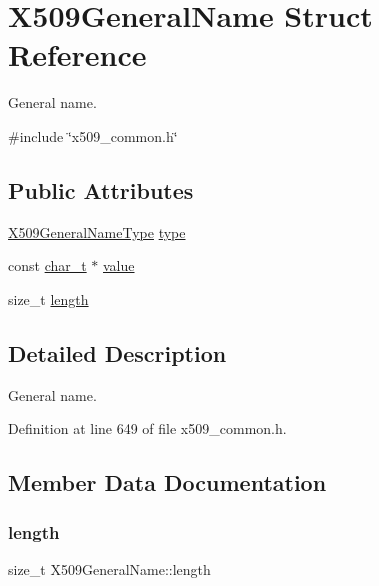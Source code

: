 \hypertarget{structX509GeneralName}{}\section{X509\+General\+Name Struct Reference}
\label{structX509GeneralName}


General name.  




{\ttfamily \#include \char`\"{}x509\+\_\+common.\+h\char`\"{}}

\subsection*{Public Attributes}
\begin{DoxyCompactItemize}
\item 
\hyperlink{certificate_2x509__common_8h_a6a82f43a61ee7a3e18d71f986d7f9a59}{X509\+General\+Name\+Type} \hyperlink{structX509GeneralName_a014e3358c1ab42d4da4cd2535d59f05f}{type}
\item 
const \hyperlink{compiler__port_8h_a40bb5262bf908c328fbcfbe5d29d0201}{char\+\_\+t} $\ast$ \hyperlink{structX509GeneralName_a00814b3509e1b708f019a645511e3d3a}{value}
\item 
size\+\_\+t \hyperlink{structX509GeneralName_a2804f41c9ae3cf1fb375b1d222d4f3af}{length}
\end{DoxyCompactItemize}


\subsection{Detailed Description}
General name. 

Definition at line 649 of file x509\+\_\+common.\+h.



\subsection{Member Data Documentation}
\mbox{\label{structX509GeneralName_a2804f41c9ae3cf1fb375b1d222d4f3af}} 
\subsubsection{\texorpdfstring{length}{length}}
{\footnotesize\ttfamily size\+\_\+t X509\+General\+Name\+::length}




